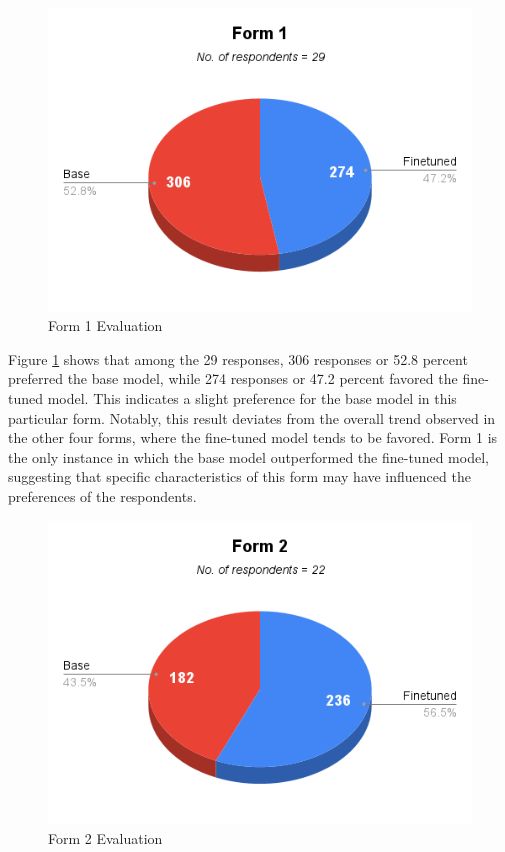 \begin{figure}[htbp]
	\centering
	\includegraphics[scale=0.7]{figures/Form1.png}
	\caption{Form 1 Evaluation}
	\label{fig:form1}
\end{figure}

Figure \ref{fig:form1} shows that among the 29 responses, 306 responses or 52.8 percent preferred the base model, while 274 responses or 47.2 percent favored the fine-tuned model. This indicates a slight preference for the base model in this particular form. Notably, this result deviates from the overall trend observed in the other four forms, where the fine-tuned model tends to be favored. Form 1 is the only instance in which the base model outperformed the fine-tuned model, suggesting that specific characteristics of this form may have influenced the preferences of the respondents. 


\begin{figure}[htbp]
	\centering
	\includegraphics[scale=0.7]{figures/Form2.png}
	\caption{Form 2 Evaluation}
	\label{fig:form2}
\end{figure}

